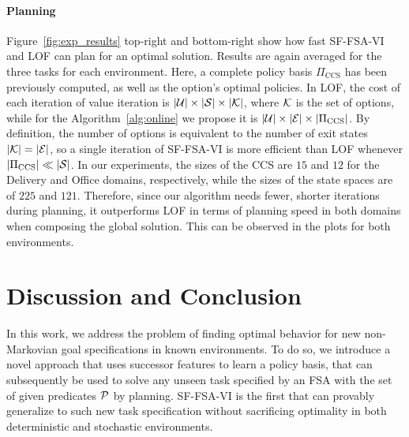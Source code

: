\paragraph{Planning} Figure~\ref{fig:exp_results} top-right and bottom-right show how fast SF-FSA-VI and LOF can plan for an optimal solution. Results are again averaged for the three tasks for each environment. Here, a complete policy basis $\Pi_\text{CCS}$ has been previously computed, as well as the option's optimal policies.  In LOF, the cost of each iteration of value iteration is $\lvert\mathcal{U}\rvert\times\lvert\mathcal{S}\rvert\times \lvert\mathcal{K}\rvert$, where $\mathcal{K}$ is the set of options, while for the Algorithm~\ref{alg:online} we propose it is $\lvert\mathcal{U}\rvert\times\lvert\mathcal{E}\rvert\times\lvert\Pi_\text{CCS}\rvert$. By definition, the number of options is equivalent to the number of exit states $\lvert\mathcal{K}\rvert=\lvert\mathcal{E}\rvert$, so a single iteration of SF-FSA-VI is more efficient than LOF whenever $\lvert\Pi_\text{CCS}\rvert \ll \lvert\mathcal{S}\rvert$. In our experiments, the sizes of the CCS are $15$ and $12$ for the Delivery and Office domains, respectively, while the sizes of the state spaces are of $225$ and $121$. Therefore, since our algorithm needs fewer, shorter iterations during planning, it outperforms LOF in terms of planning speed in both domains when composing the global solution. This can be observed in the plots for both environments. 

%     
%     

\section{Discussion and Conclusion}

In this work, we address the problem of finding optimal behavior for new non-Markovian goal specifications in known environments. To do so, we introduce a novel approach that uses successor features to learn a policy basis, that can subsequently be used to solve any unseen task specified by an FSA with the set of given predicates $\mathcal{P}$ by planning. SF-FSA-VI is the first that can provably generalize to such new task specification without sacrificing optimality in both deterministic and stochastic environments.

